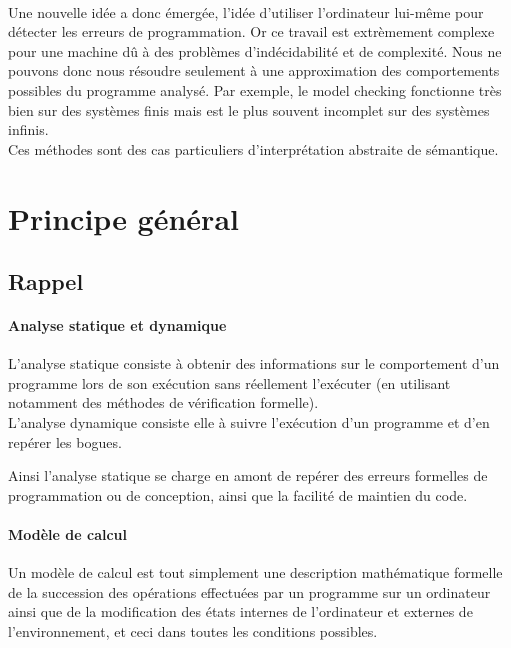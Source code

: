 \documentclass[french]{report}
\begin{document}
\paragraph{}
Une nouvelle idée a donc émergée, l'idée d'utiliser l'ordinateur lui-même pour détecter
les erreurs de programmation. Or ce travail est extrèmement complexe pour une machine dû à des
problèmes d'indécidabilité et de complexité. Nous ne pouvons donc nous résoudre seulement à une approximation
des comportements possibles du programme analysé.
Par exemple, le model checking fonctionne très bien sur des systèmes finis mais est
le plus souvent incomplet sur des systèmes infinis.  \\

Ces méthodes sont des cas particuliers d'interprétation abstraite de sémantique.

\section{Principe général}

\subsection{Rappel}
\paragraph{Analyse statique et dynamique}
L'analyse statique consiste à obtenir des informations sur le comportement d'un programme
lors de son exécution sans réellement l'exécuter (en utilisant notamment des méthodes de
vérification formelle). \\
L'analyse dynamique consiste elle à suivre l’exécution d'un programme et d'en repérer les bogues.

Ainsi l'analyse statique se charge en amont de repérer des erreurs formelles de programmation
ou de conception, ainsi que la facilité de maintien du code.


\paragraph{Modèle de calcul}
Un modèle de calcul est tout simplement une description mathématique formelle
de la succession des opérations effectuées par un programme sur un ordinateur ainsi que de
la modification des états internes de l'ordinateur et externes de l'environnement, et ceci
dans toutes les conditions possibles.
\end{document}
